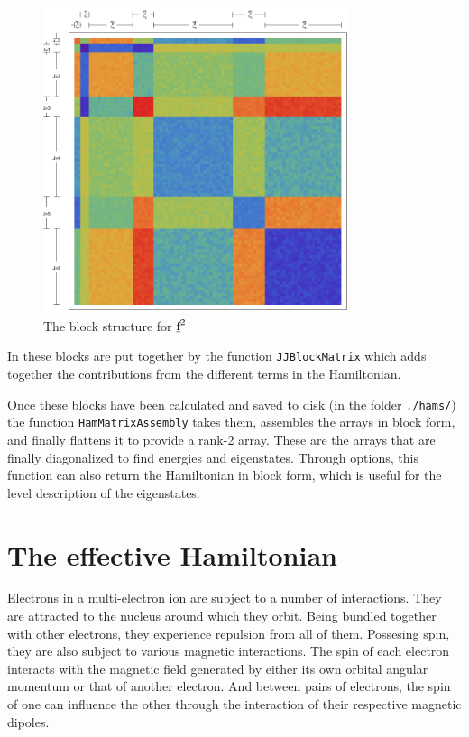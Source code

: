 \documentclass{article}
\newcommand{\codetext}[1]{{\color{BlueViolet} \texttt{#1}}}
\begin{document}
\begin{figure}[h!]
\begin{center}
	\includegraphics[width=0.8\textwidth]{blockStruct.pdf}
\end{center}
\caption{The block structure for $\underbar{$\text{f}$}^2$}
\label{JJ blocks} 
\end{figure}

In \qlanth these blocks are put together by the function \codetext{JJBlockMatrix} which adds together the contributions from the different terms in the Hamiltonian.



Once these blocks have been calculated and saved to disk (in the folder \codetext{./hams/}) the function \codetext{HamMatrixAssembly} takes them, assembles the arrays in block form, and finally flattens it to provide a rank-2 array. These are the arrays that are finally diagonalized to find energies and eigenstates. Through options, this function can also return the Hamiltonian in block form, which is useful for the level description of the eigenstates.



\section{The effective Hamiltonian} 

Electrons in a multi-electron ion are subject to a number of interactions. They are attracted to the nucleus around which they orbit. Being bundled together with other electrons, they experience repulsion from all of them. Possesing spin, they are also subject to various magnetic interactions. The spin of each electron interacts with the magnetic field generated by either its own orbital angular momentum or that of another electron. And between pairs of electrons, the spin of one can influence the other through the interaction of their respective magnetic dipoles.
\end{document}
